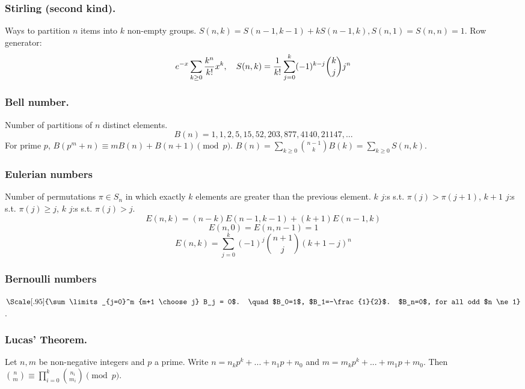 \begin{small}
    \subsubsection{Stirling (second kind).} Ways to partition $n$ items into $k$ non-empty groups. $S(n,k)=S(n-1,k-1)+kS(n-1,k), S(n,1)=S(n,n)=1$. Row generator: \[e^{-x}\sum_{k\geq 0} \frac{k^n}{k!} x^k, ~~~ S(n,k)=\frac{1}{k!}\sum_{j=0}^k (-1)^{k-j}\dbinom{k}{j} j^n\]

    \subsubsection{Bell number.} Number of partitions of $n$ distinct elements. \[B(n) = 1,1,2,5,15,52,203,877,4140,21147,\ldots\] For prime $p$, $B(p^m + n) \equiv mB(n)+B(n+1) \pmod p$. $B(n)=\sum_{k\geq 0} \binom{n-1}{k} B(k)=\sum_{k\geq 0}S(n,k)$.

  \subsubsection{Eulerian numbers}
    Number of permutations $\pi \in S_n$ in which exactly $k$ elements are greater than the previous element. $k$ $j$:s s.t. $\pi(j)>\pi(j+1)$, $k+1$ $j$:s s.t. $\pi(j)\geq j$, $k$ $j$:s s.t. $\pi(j)>j$.
    $$E(n,k) = (n-k)E(n-1,k-1) + (k+1)E(n-1,k)$$
    $$E(n,0) = E(n,n-1) = 1$$
    $$E(n,k) = \sum_{j=0}^k(-1)^j\binom{n+1}{j}(k+1-j)^n$$

  \subsubsection{Bernoulli numbers}
  $\Scale[.95]{\sum\limits_{j=0}^m {m+1 \choose j} B_j = 0$.
  \quad $B_0=1$, $B_1=-\frac{1}{2}$. $B_n=0$, for all odd $n \ne 1}$.

  \subsubsection{Lucas' Theorem.} Let $n,m$ be non-negative integers and $p$ a prime. Write $n=n_kp^k+...+n_1p+n_0$ and $m=m_kp^k+...+m_1p+m_0$. Then $\binom{n}{m} \equiv \prod_{i=0}^k\binom{n_i}{m_i} \pmod{p}$.


\end{small}
